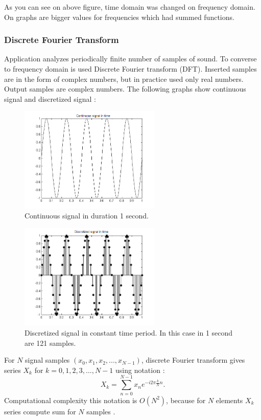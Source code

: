 \documentclass[11pt,titlepage]{article}
\theoremstyle{plain}
\begin{document}
As you can see on above figure, time domain was changed on frequency domain. On graphs are bigger values for frequencies which had summed functions.

\subsubsection{Discrete Fourier Transform}
Application analyzes periodically finite number of samples of sound. To converse to frequency domain is used Discrete Fourier transform (DFT). Inserted samples are in the form of complex numbers, but in practice used only real numbers. Output samples are complex numbers. The following graphs show continuous signal and discretized signal \cite{fourier}:

\begin{figure}[H]
	\centering
	\includegraphics[width=0.6\textwidth]{img/continues}
	\caption{Continuous signal in duration 1 second.}
	\label{fig:F6}
\end{figure}

\begin{figure}[H]
	\centering
	\includegraphics[width=0.6\textwidth]{img/descrete}
	\caption{Discretized signal in constant time period. In this case in 1 second are 121 samples.}
	\label{fig:F7}
\end{figure}

For $N$ signal samples $(x_0,x_1,x_2,...,x_{N-1})$, discrete Fourier transform gives series $X_k$ for $k = 0,1, 2, 3, ..., N-1$ using notation \cite{fourier}:
\begin{equation}
	X_k =  \sum\limits_{n=0}^{N-1} x_ne^{-i2\pi \frac{k}{N}n}.
\end{equation}
Computational complexity this notation is $O(N^2)$, because for $N$ elements $X_k$ series compute sum for $N$ samples \cite{fast_fourier}.
\end{document}
